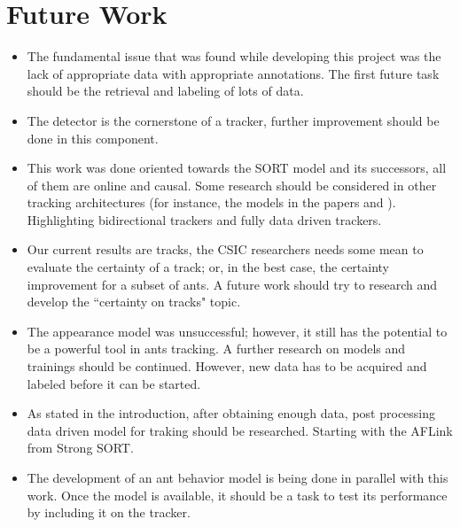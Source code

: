 
\section{Future Work}

\begin{itemize}
    \item {
        The fundamental issue that was found while developing this project was the lack of appropriate data with appropriate annotations. 
        The first future task should be the retrieval and labeling of lots of data.
    }
    \item {
        The detector is the cornerstone of a tracker, further improvement should be done in this component.
    }
    \item {
        This work was done oriented towards the \ac{SORT} model and its successors, all of them are online and causal. 
        Some research should be considered in other tracking architectures (for instance, the models in the papers \cite{10016298} and \cite{luo2023realtime}). Highlighting bidirectional trackers and fully data driven trackers.
    }
    \item {
        Our current results are tracks, the \ac{CSIC} researchers needs some mean to evaluate the certainty of a track; or, in the best case, the certainty improvement for a subset of ants.
        A future work should try to research and develop the ``certainty on tracks" topic.
    } 
    \item {
        The appearance model was unsuccessful; however, it still has the potential to be a powerful tool in ants tracking. 
        A further research on models and trainings should be continued. However, new data has to be acquired and labeled before it can be started.
    } 
    \item {
        As stated in the introduction, after obtaining enough data, post processing data driven model for traking should be researched. Starting with the AFLink from Strong SORT.
    } 
    \item {
        The development of an ant behavior model is being done in parallel with this work. 
        Once the model is available, it should be a task to test its performance by including it on the tracker.
    } 
\end{itemize}
